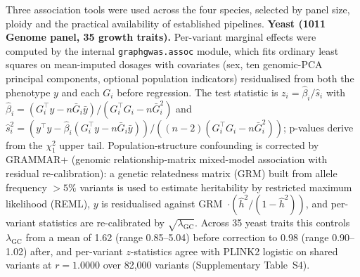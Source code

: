 Three association tools were used across the four species,
selected by panel size, ploidy and the practical availability of
established pipelines. \textbf{Yeast (1011 Genome panel, 35 growth
traits).} Per-variant marginal effects were computed by the
internal \texttt{graphgwas.assoc} module, which fits ordinary least
squares on mean-imputed dosages with covariates (sex, ten
genomic-PCA principal components, optional population indicators)
residualised from both the phenotype $y$ and each $G_i$ before
regression. The test statistic is $z_i = \hat\beta_i / \hat s_i$
with $\hat\beta_i = (G_i^\top y - n \bar G_i \bar y) / (G_i^\top G_i - n \bar G_i^2)$
and $\hat s_i^2 = (y^\top y - \hat\beta_i (G_i^\top y - n \bar G_i \bar y)) / ((n-2)(G_i^\top G_i - n\bar G_i^2))$;
p-values derive from the $\chi^2_1$ upper tail. Population-structure
confounding is corrected by GRAMMAR+ (genomic relationship-matrix
mixed-model association with residual
re-calibration)\cite{yang2011gcta}: a genetic relatedness matrix
(GRM) built from allele frequency $> 5\%$ variants is used to
estimate heritability by restricted maximum likelihood (REML), $y$
is residualised against
GRM~$\cdot (\hat h^2 / (1 - \hat h^2))$, and per-variant statistics
are re-calibrated by $\sqrt{\lambda_{\text{GC}}}$. Across 35 yeast
traits this controls $\lambda_{\text{GC}}$ from a mean of 1.62
(range 0.85--5.04) before correction to 0.98 (range 0.90--1.02)
after, and per-variant $z$-statistics agree with PLINK2\cite{chang2015second} logistic on
shared variants at $r=1.0000$ over 82{,}000 variants
(Supplementary Table~S4).

